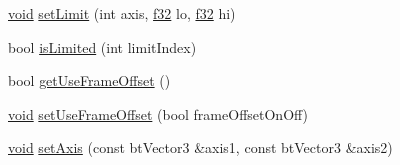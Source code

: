 \begin{DoxyCompactItemize}
\item 
\mbox{\hyperlink{_thread_8h_af1e856da2e658414cb2456cb6f7ebc66}{void}} \mbox{\hyperlink{classnjli_1_1_physics_constraint_generic6_dof_a8492ffdcfe56852bfc3cf940d955fed5}{set\+Limit}} (int axis, \mbox{\hyperlink{_util_8h_a5f6906312a689f27d70e9d086649d3fd}{f32}} lo, \mbox{\hyperlink{_util_8h_a5f6906312a689f27d70e9d086649d3fd}{f32}} hi)
\item 
bool \mbox{\hyperlink{classnjli_1_1_physics_constraint_generic6_dof_a4b7ccf539945ec18862d03459cc7af4d}{is\+Limited}} (int limit\+Index)
\item 
bool \mbox{\hyperlink{classnjli_1_1_physics_constraint_generic6_dof_a5e88bda1b6f298611499a60e0a431587}{get\+Use\+Frame\+Offset}} ()
\item 
\mbox{\hyperlink{_thread_8h_af1e856da2e658414cb2456cb6f7ebc66}{void}} \mbox{\hyperlink{classnjli_1_1_physics_constraint_generic6_dof_a7f85647f957150c306f7086e6a36fc0b}{set\+Use\+Frame\+Offset}} (bool frame\+Offset\+On\+Off)
\item 
\mbox{\hyperlink{_thread_8h_af1e856da2e658414cb2456cb6f7ebc66}{void}} \mbox{\hyperlink{classnjli_1_1_physics_constraint_generic6_dof_a476bea05db9265b4efacc503b6693615}{set\+Axis}} (const bt\+Vector3 \&axis1, const bt\+Vector3 \&axis2)
\end{DoxyCompactItemize}
